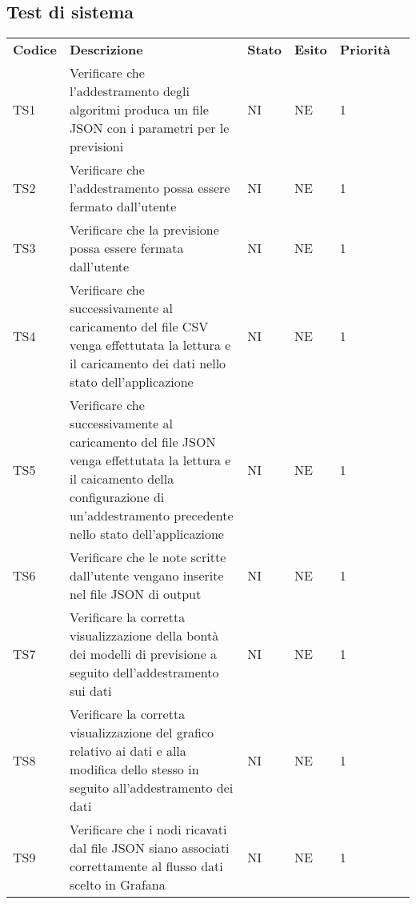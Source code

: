 
\subsection{Test di sistema}

\begin{longtable} {
	>{}p{12mm}
	>{}p{79.5mm}
	>{}p{9mm}
	>{}p{8mm}
	>{}p{14mm}
	>{}p{0mm}}
	\rowcolor{gray!50}
	\textbf{Codice} & \textbf{Descrizione} & \textbf{Stato} & \textbf{Esito} & \textbf{Priorità} & \TBstrut \\
	TS1 & Verificare che l'addestramento degli algoritmi produca un file JSON con i parametri per le previsioni & NI & NE  & 1 & \TBstrut \\ [2mm]
	TS2 & Verificare che l'addestramento possa essere fermato dall'utente & NI & NE  & 1 & \TBstrut \\ [2mm]
	TS3 & Verificare che la previsione possa essere fermata dall'utente & NI & NE  & 1 & \TBstrut \\ [2mm]
	TS4 & Verificare che successivamente al caricamento del file CSV venga effettutata la lettura e il caricamento dei dati nello stato dell'applicazione & NI & NE  & 1 & \TBstrut \\ [2mm]
	TS5 & Verificare che successivamente al caricamento del file JSON venga effettutata la lettura e il caicamento della configurazione di un'addestramento precedente nello stato dell'applicazione & NI & NE  & 1 & \TBstrut \\ [2mm]
	TS6 & Verificare che le note scritte dall'utente vengano inserite nel file JSON di output & NI & NE  & 1 & \TBstrut \\ [2mm]
	TS7 & Verificare la corretta visualizzazione della bontà dei modelli di previsione a seguito dell'addestramento sui dati & NI & NE  & 1 & \TBstrut \\ [2mm]
	TS8 & Verificare la corretta visualizzazione del grafico relativo ai dati e alla modifica dello stesso in seguito all'addestramento dei dati & NI & NE  & 1 & \TBstrut \\ [2mm]
	TS9 & Verificare che i nodi ricavati dal file JSON siano associati correttamente al flusso dati scelto in Grafana\glo & NI & NE & 1 & \TBstrut \\ [2mm]

\end{longtable}
